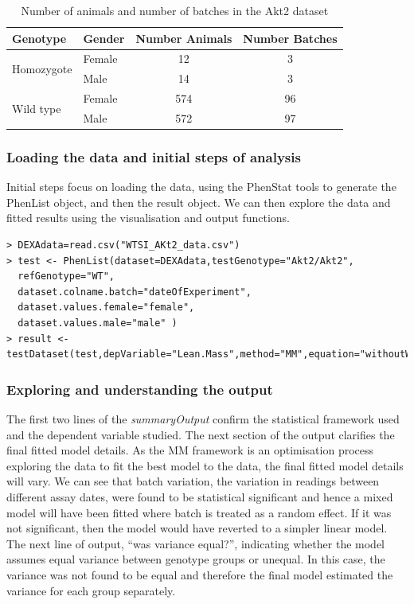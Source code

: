 \documentclass[12pt,a4paper]{article}
\begin{document}
\begin{table}[!h]
\begin{center}
\begin{tabular}{| l | l | c | c |}
  \hline
Genotype&Gender&Number Animals&Number Batches\\\hline
\multirow{2}{*}{Homozygote}&Female&12&3\\
			    &Male&14&3\\
			    \hline
\multirow{2}{*}{Wild type}&Female&574&96\\
			    &Male&572&97\\

\hline  
\end{tabular}
\caption{Number of animals and number of batches in the Akt2 dataset}\label{table:05}
\end{center}
\end{table}

\subsubsection{Loading the data and initial steps of analysis}
Initial steps focus on loading the data, using the PhenStat tools to generate the PhenList object, and then the result object.  
We can then explore the data and fitted results using the visualisation and output functions.   
\begingroup
    \fontsize{8pt}{12pt}\selectfont
\begin{verbatim}
> DEXAdata=read.csv("WTSI_AKt2_data.csv")
> test <- PhenList(dataset=DEXAdata,testGenotype="Akt2/Akt2",  
  refGenotype="WT",
  dataset.colname.batch="dateOfExperiment", 
  dataset.values.female="female", 
  dataset.values.male="male" )
> result <- testDataset(test,depVariable="Lean.Mass",method="MM",equation="withoutWeight")
\end{verbatim}
\endgroup 



\subsubsection{Exploring and understanding the output}
\label{cs1_output}
The first two lines of the \textit{summaryOutput} confirm the statistical framework used and the dependent variable studied.   
The next section of the output clarifies the final fitted model details. As the MM framework is an optimisation process exploring the data to fit the best model to the data, 
the final fitted model details will vary. We can see that batch variation, the variation in readings between different assay dates, 
were found to be statistical significant and hence a mixed model will have been fitted where batch is treated as a random effect.  
If it was not significant, then the model would have reverted to a simpler linear model.  
The next line of output, “was variance equal?”, indicating whether the model assumes equal variance between genotype groups or unequal.  
In this case, the variance was not found to be equal and therefore the final model estimated the variance for each group separately. 
\end{document}
